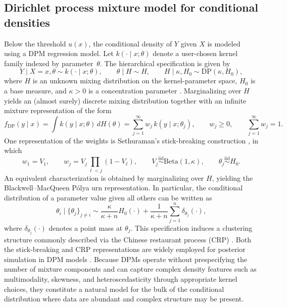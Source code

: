 \documentclass[11pt]{article}\usepackage[]{graphicx}\usepackage[]{xcolor}
\begin{document}
\subsection{Dirichlet process mixture model for conditional densities}
\label{subsec:dpm}

Below the threshold $u(x)$, the conditional density of $Y$ given $X$
is modeled using a DPM regression model.  Let
$k(\cdot\mid x;\theta)$ denote a user-chosen kernel family indexed by
parameter~$\theta$.  The hierarchical specification is given by
\begin{equation*}
Y \mid X=x,\theta \sim k(\cdot\mid x;\theta),
\qquad
\theta \mid H \sim H,
\qquad
H \mid \kappa,H_0 \sim \mathrm{DP}(\kappa,H_0),
\end{equation*}
where $H$ is an unknown mixing distribution on the kernel-parameter
space, $H_0$ is a base measure, and $\kappa>0$ is a concentration
parameter \citep{Ferguson1973}.  Marginalizing over $H$ yields an
(almost surely) discrete mixing distribution together with an infinite
mixture representation of the form
\begin{equation*}
f_{\mathrm{DP}}(y\mid x)
=
\int k(y\mid x;\theta)\,dH(\theta)
=
\sum_{j=1}^{\infty} w_j\,k(y\mid x;\theta_j),
\qquad
w_j\ge 0,
\qquad
\sum_{j=1}^{\infty} w_j=1.
\end{equation*}
One representation of the weights is Sethuraman's stick-breaking
construction \citep{Sethuraman1994}, in which
\begin{equation}
w_1=V_1,
\qquad
w_j=V_j\prod_{\ell<j}(1-V_\ell),
\qquad
V_j \stackrel{\mathrm{iid}}{\sim}\mathrm{Beta}(1,\kappa),
\qquad
\theta_j \stackrel{\mathrm{iid}}{\sim} H_0.
\label{eq:sb}
\end{equation}
An equivalent characterization is obtained by marginalizing over $H$,
yielding the Blackwell--MacQueen P\'olya urn representation.  In
particular, the conditional distribution of a parameter value given all
others can be written as
\begin{equation*}
\theta_i \mid \{\theta_j\}_{j \neq i}
\sim
\frac{\kappa}{\kappa+n} H_0(\cdot)
+
\frac{1}{\kappa+n}\sum_{j=1}^{n}\delta_{\theta_j}(\cdot),
\end{equation*}
where $\delta_{\theta_j}(\cdot)$ denotes a point mass at $\theta_j$.
This specification induces a clustering structure commonly described
via the Chinese restaurant process (CRP) \citep{Neal2000}.  Both the
stick-breaking and CRP representations are widely employed for
posterior simulation in DPM models
\citep{EscobarWest1995,Neal2000}.  Because DPMs operate without
prespecifying the number of mixture components and can capture complex
density features such as multimodality, skewness, and
heteroscedasticity through appropriate kernel choices, they constitute
a natural model for the bulk of the conditional distribution where data
are abundant and complex structure may be present.
\end{document}
